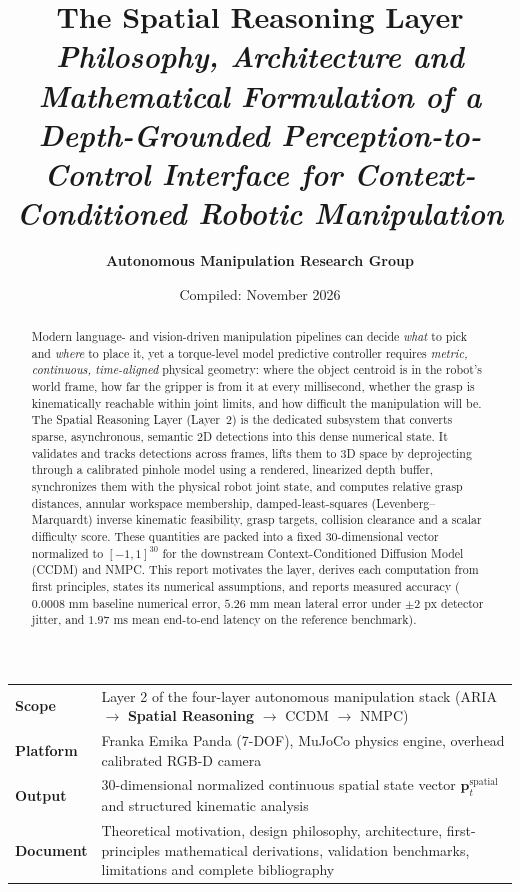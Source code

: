\documentclass[10pt,a4paper]{article}
\title{
  \vspace{-1.0cm}
  {\Huge\textbf{\color{navy} The Spatial Reasoning Layer}}\\[0.4cm]
  {\large\textit{\color{medgray} Philosophy, Architecture and Mathematical Formulation of a Depth-Grounded Perception-to-Control Interface for Context-Conditioned Robotic Manipulation}}
}
\author{\textbf{Autonomous Manipulation Research Group}}
\date{\small Compiled: November 2026}
\begin{document}
\maketitle
\thispagestyle{empty}

\begin{table}[h]
\centering
\small
\begin{tabularx}{\linewidth}{p{2.6cm}X}
\toprule
\textbf{Scope} & Layer 2 of the four-layer autonomous manipulation stack (\textsf{ARIA} $\rightarrow$ \textbf{Spatial Reasoning} $\rightarrow$ \textsf{CCDM} $\rightarrow$ \textsf{NMPC}) \\
\textbf{Platform} & Franka Emika Panda (7-DOF), MuJoCo physics engine, overhead calibrated RGB-D camera \\
\textbf{Output} & 30-dimensional normalized continuous spatial state vector $\mathbf{p}_t^{\mathrm{spatial}}$ and structured kinematic analysis \\
\textbf{Document} & Theoretical motivation, design philosophy, architecture, first-principles mathematical derivations, validation benchmarks, limitations and complete bibliography \\
\bottomrule
\end{tabularx}
\end{table}

\begin{abstract}
Modern language- and vision-driven manipulation pipelines can decide \emph{what} to pick and \emph{where} to place it, yet a torque-level model predictive controller requires \emph{metric, continuous, time-aligned} physical geometry: where the object centroid is in the robot's world frame, how far the gripper is from it at every millisecond, whether the grasp is kinematically reachable within joint limits, and how difficult the manipulation will be. The Spatial Reasoning Layer (Layer~2) is the dedicated subsystem that converts sparse, asynchronous, semantic 2D detections into this dense numerical state. It validates and tracks detections across frames, lifts them to 3D space by deprojecting through a calibrated pinhole model using a rendered, linearized depth buffer, synchronizes them with the physical robot joint state, and computes relative grasp distances, annular workspace membership, damped-least-squares (Levenberg--Marquardt) inverse kinematic feasibility, grasp targets, collision clearance and a scalar difficulty score. These quantities are packed into a fixed 30-dimensional vector normalized to $[-1, 1]^{30}$ for the downstream Context-Conditioned Diffusion Model (CCDM) and NMPC. This report motivates the layer, derives each computation from first principles, states its numerical assumptions, and reports measured accuracy ($0.0008\text{ mm}$ baseline numerical error, $5.26\text{ mm}$ mean lateral error under $\pm 2\text{ px}$ detector jitter, and $1.97\text{ ms}$ mean end-to-end latency on the reference benchmark).
\end{abstract}
\end{document}

